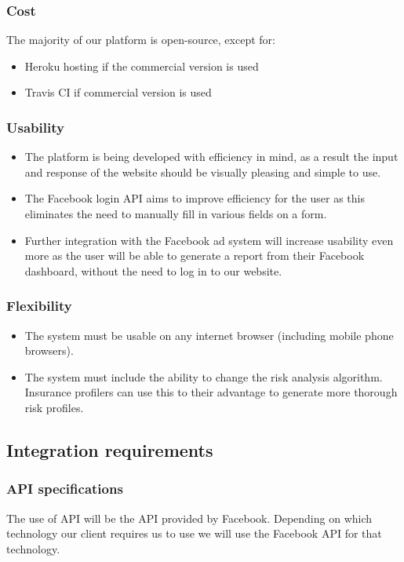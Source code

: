\documentclass{article}
\begin{document}
		\subsubsection{Cost}
			The majority of our platform is open-source, except for:
		\begin{itemize}
			\item Heroku hosting if the commercial version is used
			\item Travis CI if commercial version is used
		\end{itemize}

		\subsubsection{Usability}
		\begin{itemize}
			\item The platform is being developed with efficiency in mind, as a result the input and response of the website should be visually pleasing and simple to use.
			\item The Facebook login API aims to improve efficiency for the user as this eliminates the need to manually fill in various fields on a form.
			\item Further integration with the Facebook ad system will increase usability even more as the user will be able to generate a report from their Facebook dashboard, without the need to log in to our website.
		\end{itemize}
		\subsubsection{Flexibility}
		\begin{itemize}
			\item The system must be usable on any internet browser (including mobile phone browsers). 
			\item The system must include the ability to change the risk analysis algorithm. Insurance profilers can use this to their advantage to generate more thorough risk profiles. 
		\end{itemize}
		
		 

	\subsection{Integration requirements}
		\subsubsection{API specifications}
			The use of API will be the API provided by Facebook. Depending on which technology our client requires us to use we will use the Facebook API for that technology.
\end{document}

